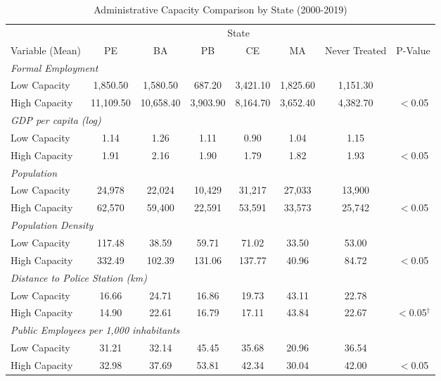 \documentclass[12pt]{article}
\begin{document}
\begin{table}[htbp]
\centering
\caption{Administrative Capacity Comparison by State (2000-2019)}
\label{tab:capacity_comparison}
\begin{threeparttable}
\small
\begin{adjustbox}{max width=\textwidth}
\begin{tabular}{lccccccc}
\toprule
& \multicolumn{6}{c}{State} & \\
\cmidrule(lr){2-7}
Variable (Mean) & PE & BA & PB & CE & MA & Never Treated & P-Value \\
\midrule
\multicolumn{8}{l}{\textit{Formal Employment}} \\
\quad Low Capacity & 1,850.50 & 1,580.50 & 687.20 & 3,421.10 & 1,825.60 & 1,151.30 & \\
\quad High Capacity & 11,109.50 & 10,658.40 & 3,903.90 & 8,164.70 & 3,652.40 & 4,382.70 & $<$0.05 \\[4pt]
\multicolumn{8}{l}{\textit{GDP per capita (log)}} \\
\quad Low Capacity & 1.14 & 1.26 & 1.11 & 0.90 & 1.04 & 1.15 & \\
\quad High Capacity & 1.91 & 2.16 & 1.90 & 1.79 & 1.82 & 1.93 & $<$0.05 \\[4pt]
\multicolumn{8}{l}{\textit{Population}} \\
\quad Low Capacity & 24,978 & 22,024 & 10,429 & 31,217 & 27,033 & 13,900 & \\
\quad High Capacity & 62,570 & 59,400 & 22,591 & 53,591 & 33,573 & 25,742 & $<$0.05 \\[4pt]
\multicolumn{8}{l}{\textit{Population Density}} \\
\quad Low Capacity & 117.48 & 38.59 & 59.71 & 71.02 & 33.50 & 53.00 & \\
\quad High Capacity & 332.49 & 102.39 & 131.06 & 137.77 & 40.96 & 84.72 & $<$0.05 \\[4pt]
\multicolumn{8}{l}{\textit{Distance to Police Station (km)}} \\
\quad Low Capacity & 16.66 & 24.71 & 16.86 & 19.73 & 43.11 & 22.78 & \\
\quad High Capacity & 14.90 & 22.61 & 16.79 & 17.11 & 43.84 & 22.67 & $<$0.05$^{\dag}$ \\[4pt]
\multicolumn{8}{l}{\textit{Public Employees per 1,000 inhabitants}} \\
\quad Low Capacity & 31.21 & 32.14 & 45.45 & 35.68 & 20.96 & 36.54 & \\
\quad High Capacity & 32.98 & 37.69 & 53.81 & 42.34 & 30.04 & 42.00 & $<$0.05 \\[4pt]

\end{tabular}
\end{adjustbox}
\end{threeparttable}
\end{table}
\end{document}
